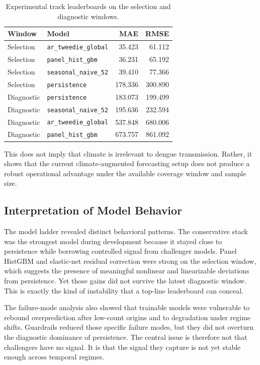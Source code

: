 \documentclass[11pt]{article}
\begin{document}
\begin{table}[H]
\centering
\caption{Experimental track leaderboards on the selection and diagnostic windows.}
\label{tab:experimental-results}
\begin{tabular}{llrr}
\toprule
Window & Model & MAE & RMSE \\
\midrule
Selection & \texttt{ar\_tweedie\_global} & 35.423 & 61.112 \\
Selection & \texttt{panel\_hist\_gbm} & 36.231 & 65.192 \\
Selection & \texttt{seasonal\_naive\_52} & 39.410 & 77.366 \\
Selection & \texttt{persistence} & 178.336 & 300.890 \\
\midrule
Diagnostic & \texttt{persistence} & 183.073 & 199.499 \\
Diagnostic & \texttt{seasonal\_naive\_52} & 195.636 & 232.594 \\
Diagnostic & \texttt{ar\_tweedie\_global} & 537.848 & 680.006 \\
Diagnostic & \texttt{panel\_hist\_gbm} & 673.757 & 861.092 \\
\bottomrule
\end{tabular}
\end{table}

This does not imply that climate is irrelevant to dengue transmission. Rather, it shows that the current climate-augmented forecasting setup does not produce a robust operational advantage under the available coverage window and sample size.

\subsection{Interpretation of Model Behavior}
The model ladder revealed distinct behavioral patterns. The conservative stack was the strongest model during development because it stayed close to persistence while borrowing controlled signal from challenger models. Panel HistGBM and elastic-net residual correction were strong on the selection window, which suggests the presence of meaningful nonlinear and linearizable deviations from persistence. Yet those gains did not survive the latest diagnostic window. This is exactly the kind of instability that a top-line leaderboard can conceal.

The failure-mode analysis also showed that trainable models were vulnerable to rebound overprediction after low-count origins and to degradation under regime shifts. Guardrails reduced those specific failure modes, but they did not overturn the diagnostic dominance of persistence. The central issue is therefore not that challengers have no signal. It is that the signal they capture is not yet stable enough across temporal regimes.
\end{document}
